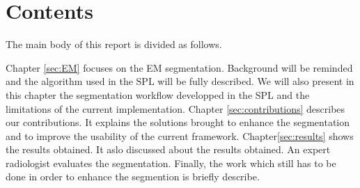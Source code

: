 \section{Contents}\label{intro:contents}
The main body of this report is divided as follows.
\par
Chapter \ref{sec:EM} focuses on the EM segmentation. Background will be reminded and the algorithm used in the SPL will be fully described. We will also present in this chapter the segmentation workflow developped in the SPL and the limitations of the current implementation.
Chapter \ref{sec:contributions} describes our contributions. It explains the solutions brought to enhance the segmentation and to improve the usability of the current framework.
Chapter\ref{sec:results} shows the results obtained. It aslo discussed about the results obtained. An expert radiologist evaluates the segmentation. Finally, the work which still has to be done in order to enhance the segmention is briefly describe.
%
